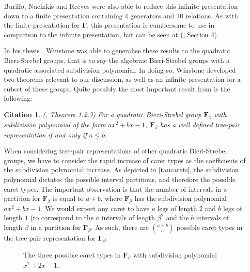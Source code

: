 \documentclass[
11pt, %
english, %
singlespacing, %
parskip, %
headsepline, %
]{amsart} %
\newtheorem{citing}[theorem]{Citation}
\theoremstyle{definition}
\newcommand{\TF}{\textbf{F}}
\newcommand{\FN}[1]{$\textbf{F}_{#1}$}
\begin{document}
Burillo, Nucinkis and Reeves were also able to reduce this infinite presentation down to a finite presentation containing $4$ generators and $10$ relations. As with the finite presentation for $\TF$, this presentation is cumbersome to use in comparison to the infinite presentation, but can be seen at (\cite{Ftau}, Section 4).
\par
In his thesis \cite{Winstone}, Winstone was able to generalise these results to the quadratic Bieri-Strebel groups, that is to say the algebraic Bieri-Strebel groups with a quadratic associated subdivision polynomial. In doing so, Winstone developed two theorems relevant to our discussion, as well as an infinite presentation for a subset of these groups. Quite possibly the most important result from \cite{Winstone} is the following:

\begin{citing}\label{deftree}
(\cite{Winstone}, Theorem 1.2.3) For a quadratic Bieri-Strebel group \FN{\beta} with subdivision polynomial of the form $ax^2+bx-1$, \FN{\beta} has a well defined tree-pair representation if and only if $a \leq b$.
\end{citing}

When considering tree-pair representations of other quadratic Bieri-Strebel groups, we have to consider the rapid increase of caret types as the coefficients of the subdivision polynomial increase. As depicted in \ref{taucarets}, the subdivision polynomial dictates the possible interval partitions, and therefore the possible caret types. The important observation is that the number of intervals in a partition for \FN{\beta} is equal to $a+b$, where \FN{\beta} has the subdivision polynomial $ax^2+bx-1$. We would expect any caret to have $a$ legs of length $2$ and $b$ legs of length $1$ (to correspond to the $a$ intervals of length $\beta^2$ and the $b$ intervals of length $\beta$ in a partition for \FN{\beta}. As such, there are ${a+b}\choose{a}$ possible caret types in the tree pair representation for \FN{\beta}.

\begin{center}
\begin{figure}[H]
\centering
{}
\caption{The three possible caret types in \FN{\beta} with subdivision polynomial $x^2+2x-1$.} 
\end{figure}
\end{center}
\end{document}
